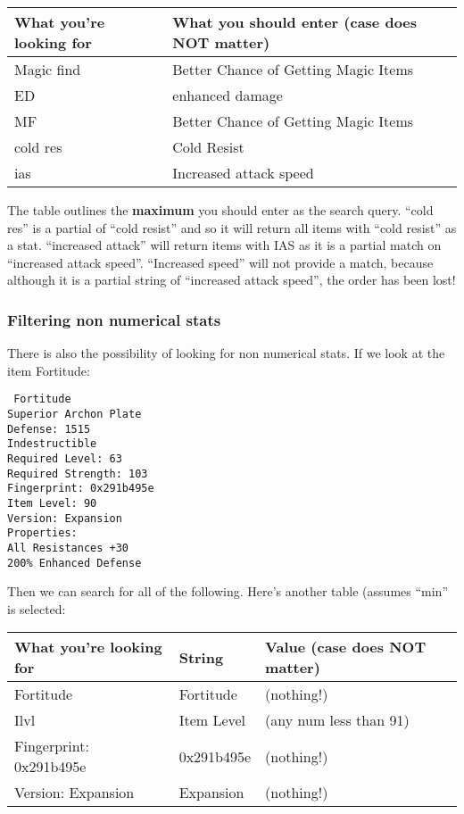 \documentclass[a4paper,10pt]{article}
\begin{document}
\begin{table}[h]
\begin{center}
\begin{tabular}{l|p{3.8in}}
What you're looking for & What you should enter (case does \textbf{NOT} matter)\\
\hline
Magic find & Better Chance of Getting Magic Items\\
ED & enhanced damage\\
MF & Better Chance of Getting Magic Items\\
cold res & Cold Resist \\
ias & Increased attack speed\\
\end{tabular}
\end{center}
\end{table}

The table outlines the \textbf{maximum} you should enter as the search query. ``cold res'' is a partial of ``cold resist'' and so it will return all items with ``cold resist'' as a stat. ``increased attack'' will return items with IAS as it is a partial match on ``increased attack speed''. ``Increased speed'' will not provide a match, because although it is a partial string of ``increased attack speed'', the order has been lost!

\subsubsection{Filtering non numerical stats}

There is also the possibility of looking for non numerical stats. If we look at the item Fortitude:


\begin{verbatim}
 Fortitude
Superior Archon Plate
Defense: 1515
Indestructible
Required Level: 63
Required Strength: 103
Fingerprint: 0x291b495e
Item Level: 90
Version: Expansion
Properties: 
All Resistances +30
200% Enhanced Defense
\end{verbatim}

Then we can search for all of the following. Here's another table (assumes ``min'' is selected:

\begin{table}[h]
\begin{center}
\begin{tabular}{l|l|l}
What you're looking for & String & Value (case does \textbf{NOT} matter)\\
\hline
Fortitude & Fortitude & (nothing!) \\
Ilvl & Item Level & (any num less than 91)\\
Fingerprint: 0x291b495e & 0x291b495e & (nothing!)\\
Version: Expansion & Expansion & (nothing!)\\
\end{tabular}
\end{center}
\end{table}
\end{document}
